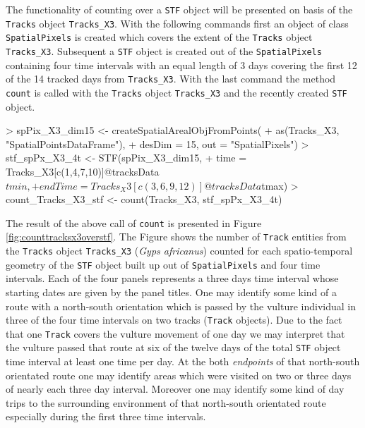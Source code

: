 \documentclass[12pt, oneside, a4paper]{scrbook}
\let\code=\texttt
\begin{document}
The functionality of counting over a \code{STF} object will be presented on basis of the \code{Tracks} object \code{Tracks\_X3}.
With the following commands first an object of class \code{SpatialPixels} is created which covers the extent of the \code{Tracks} object \code{Tracks\_X3}. Subsequent a \code{STF} object is created out of the \code{SpatialPixels} containing four time intervals with an equal length of 3 days covering the first 12 of the 14 tracked days from \code{Tracks\_X3}. With the last command the method \code{count} is called with the \code{Tracks} object \code{Tracks\_X3} and the recently created \code{STF} object.

\par\medskip

\begin{small}
\begin{Schunk}
\begin{Sinput}
> spPix_X3_dim15 <- createSpatialArealObjFromPoints(
+   as(Tracks_X3, "SpatialPointsDataFrame"), 
+   desDim = 15, out = "SpatialPixels")
> stf_spPx_X3_4t <- STF(spPix_X3_dim15,
+                       time = Tracks_X3[c(1,4,7,10)]@tracksData$tmin,
+                       endTime = Tracks_X3[c(3,6,9,12)]@tracksData$tmax)
> count_Tracks_X3_stf <- count(Tracks_X3, stf_spPx_X3_4t)
\end{Sinput}
\end{Schunk}
\end{small}

\par\medskip

The result of the above call of \code{count} is presented in Figure \ref{fig:counttracksx3overstf}.
The Figure shows the number of \code{Track} entities from the \code{Tracks} object \code{Tracks\_X3} (\textit{Gyps africanus}) counted for each spatio-temporal geometry of the \code{STF} object built up out of \code{SpatialPixels} and four time intervals. Each of the four panels represents a three days time interval whose starting dates are given by the panel titles. One may identify some kind of a route with a north-south orientation which is passed by the vulture individual in three of the four time intervals on two tracks (\code{Track} objects). Due to the fact that one \code{Track} covers the vulture movement of one day we may interpret that the vulture passed that route at six of the twelve days of the total \code{STF} object time interval at least one time per day. At the both \textit{endpoints} of that north-south orientated route one may identify areas which were visited on two or three days of nearly each three day interval. Moreover one may identify some kind of day trips to the surrounding environment of that north-south orientated route especially during the first three time intervals.
\end{document}
